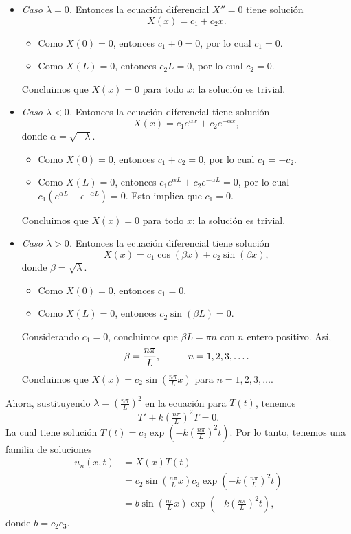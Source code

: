 \documentclass[11pt,letterpaper,draft]{report}
\theoremstyle{plain}
\theoremstyle{definition}
\theoremstyle{remark}
\newcommand\<{\langle}
\renewcommand\>{\rangle}
\begin{document}
\begin{itemize}
  \item \emph{Caso $\lambda=0$.}
  Entonces la ecuación diferencial $X''=0$ tiene solución
  \[
    X(x)=c_1+c_2x
  .\]
  \begin{itemize}
    \item
    Como $X(0)=0$, entonces $c_1+0=0$, por lo cual $c_1=0$.
    \item
    Como $X(L)=0$, entonces $c_2L=0$, por lo cual $c_2=0$.
  \end{itemize}
  Concluimos que $X(x)=0$ para todo $x$: la solución es trivial.

  \item \emph{Caso $\lambda<0$.}
  Entonces la ecuación diferencial tiene solución
  \[
    X(x) = c_1e^{\alpha x} + c_2 e^{-\alpha x}
  ,\]
  donde $\alpha=\sqrt{-\lambda}$.
  \begin{itemize}
    \item
    Como $X(0)=0$, entonces $c_1+c_2=0$, por lo cual $c_1=-c_2$.
    \item
    Como $X(L)=0$, entonces $c_1e^{\alpha L}+c_2e^{-\alpha L}=0$,
    por lo cual $c_1(e^{\alpha L}-e^{-\alpha L})=0$. Esto implica
    que $c_1=0$.
  \end{itemize}
  Concluimos que $X(x)=0$ para todo $x$: la solución es trivial.

  \item \emph{Caso $\lambda>0$.}
  Entonces la ecuación diferencial tiene solución
  \[
    X(x)= c_1\cos(\beta x)+c_2\sin(\beta x)
  ,\]
  donde $\beta=\sqrt{\lambda}$.
  \begin{itemize}
    \item Como $X(0)=0$, entonces $c_1=0$.
    \item Como $X(L)=0$, entonces $c_2\sin(\beta L)=0$.
  \end{itemize}
  Considerando $c_1=0$, concluimos que $\beta L=\pi n$ con $n$
  entero positivo. Así,
  \[
    \beta= \frac{n\pi}{L}, \hspace{10mm} n=1,2,3,\dots
  .\]
  Concluimos que
  $X(x)=c_2\sin(\tfrac{n\pi}{L}x)$ para $n=1,2,3,\dots$.
\end{itemize}

Ahora, sustituyendo $\lambda=(\tfrac{n\pi}{L})^2$ en la ecuación
para $T(t)$, tenemos
\[
  T' + k (\tfrac{n\pi}{L})^2 T = 0
.\]
La cual tiene solución $T(t)=c_3\exp(-k(\tfrac{n\pi}{L})^2t)$.
Por lo tanto, tenemos una familia de soluciones
\begin{align*}
  u_n(x,t)
  &= X(x)T(t) \\
  &= c_2\sin(\tfrac{n\pi}{L}x)c_3\exp(-k(\tfrac{n\pi}{L})^2t) \\
  &= b\sin(\tfrac{n\pi}{L}x)\exp(-k(\tfrac{n\pi}{L})^2t),
\end{align*}
donde $b=c_2c_3$.
\end{document}
